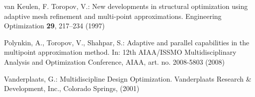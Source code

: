 \documentclass[runningheads,a4paper]{llncs}
\begin{document}
\begin{thebibliography}{10}
van Keulen, F. Toropov, V.:
\newblock New developments in structural optimization using adaptive mesh refinement and multi-point approximations.
\newblock Engineering Optimization \textbf{29}, 217--234 (1997)

Polynkin, A., Toropov, V., Shahpar, S.:
\newblock Adaptive and parallel capabilities in the multipoint approximation  method.
\newblock In: 12th AIAA/ISSMO Multidisciplinary Analysis and Optimization Conference, AIAA, art. no. 2008-5803 (2008)

Vanderplaats, G.:
\newblock Multidiscipline Design Optimization. 
\newblock Vanderplaats Research \& Development, Inc., Colorado Springs, (2001)

\end{thebibliography}
\end{document}
